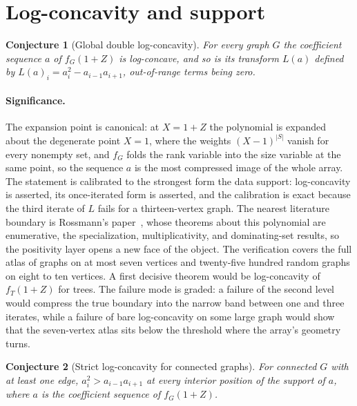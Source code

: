\documentclass[11pt]{article}
\newtheorem{conjecture}{Conjecture}
\theoremstyle{definition}
\begin{document}
\section{Log-concavity and support}

\begin{conjecture}[Global double log-concavity]\label{u11}
For every graph $G$ the coefficient sequence $a$ of $f_G(1+Z)$ is log-concave, and so is its transform $L(a)$ defined by $L(a)_i=a_i^2-a_{i-1}a_{i+1}$, out-of-range terms being zero.
\end{conjecture}

\paragraph{Significance.}
The expansion point is canonical: at $X=1+Z$ the polynomial is expanded about the degenerate point $X=1$, where the weights $(X-1)^{|S|}$ vanish for every nonempty set, and $f_G$ folds the rank variable into the size variable at the same point, so the sequence $a$ is the most compressed image of the whole array.  The statement is calibrated to the strongest form the data support: log-concavity is asserted, its once-iterated form is asserted, and the calibration is exact because the third iterate of $L$ fails for a thirteen-vertex graph.  The nearest literature boundary is Rossmann's paper~\cite{Ros22}, whose theorems about this polynomial are enumerative, the specialization, multiplicativity, and dominating-set results, so the positivity layer opens a new face of the object.  The verification covers the full atlas of graphs on at most seven vertices and twenty-five hundred random graphs on eight to ten vertices.  A first decisive theorem would be log-concavity of $f_T(1+Z)$ for trees.  The failure mode is graded: a failure of the second level would compress the true boundary into the narrow band between one and three iterates, while a failure of bare log-concavity on some large graph would show that the seven-vertex atlas sits below the threshold where the array's geometry turns.


\begin{conjecture}[Strict log-concavity for connected graphs]\label{u12}
For connected $G$ with at least one edge, $a_i^2>a_{i-1}a_{i+1}$ at every interior position of the support of $a$, where $a$ is the coefficient sequence of $f_G(1+Z)$.
\end{conjecture}
\end{document}
